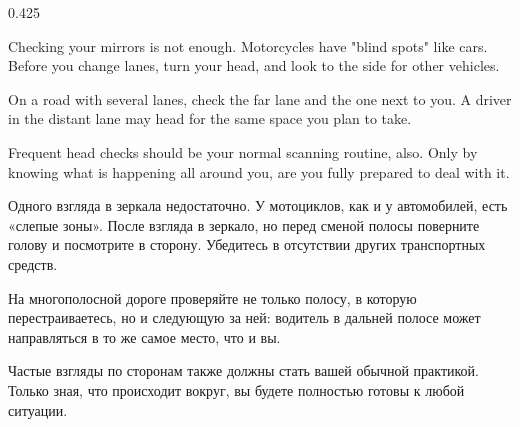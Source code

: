 \begin{langblock}{0.425}
	\begin{eng}
	
	Checking your mirrors is not enough. Motorcycles have "blind spots" like cars. Before you change lanes, turn your head, and look to the side for other vehicles.
	
	On a road with several lanes, check the far lane and the one next to you. A driver in the distant lane may head for the same space you plan to take.
	
	Frequent head checks should be your normal scanning routine, also.  Only by knowing what is happening all around you, are you fully prepared to deal with it.
	\end{eng}
	\begin{rus}
		
		Одного взгляда в зеркала недостаточно. У мотоциклов, как и у автомобилей, есть «слепые зоны». После взгляда в зеркало, но перед сменой полосы поверните голову и посмотрите в сторону. Убедитесь в отсутствии других транспортных средств.
		
		На многополосной дороге проверяйте не только полосу, в которую перестраиваетесь, но и следующую за ней: водитель в дальней полосе может направляться в то же самое место, что и вы.
		
		Частые взгляды по сторонам также должны стать вашей обычной практикой.  Только зная, что происходит вокруг, вы будете полностью готовы к любой ситуации.
\end{rus}
\end{langblock}



